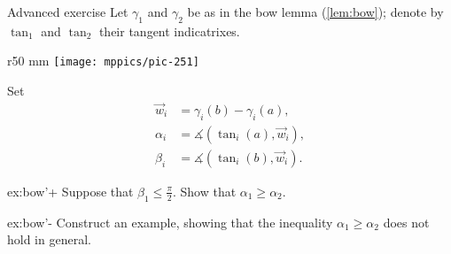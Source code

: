 \begin{thm}{Advanced exercise}\label{ex:bow'}
Let $\gamma_1$ and $\gamma_2$ be as in the bow lemma (\ref{lem:bow});
denote by $\tan_1$ and $\tan_2$ their tangent indicatrixes.

{

\begin{wrapfigure}{r}{50 mm}
\vskip-0mm
\centering
\texttt{[image: mppics/pic-251]}
\vskip-0mm
\end{wrapfigure}

Set
\begin{align*}
\vec w_i&=\gamma_i(b)-\gamma_i(a),
\\
\alpha_i&=\measuredangle(\tan_i(a),\vec w_i),
\\
\beta_i&=\measuredangle(\tan_i(b),\vec w_i).
\end{align*}

}

\begin{subthm}{ex:bow'+}
Suppose that $\beta_1\le\tfrac\pi2$.
Show that $\alpha_1\ge \alpha_2$.
\end{subthm}

\begin{subthm}{ex:bow'-} Construct an example, showing that the inequality $\alpha_1\ge \alpha_2$ does not hold in general.
\end{subthm}

\end{thm}

